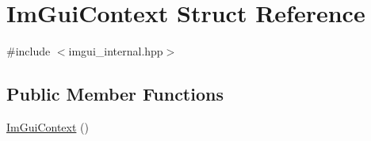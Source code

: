 \hypertarget{struct_im_gui_context}{}\section{Im\+Gui\+Context Struct Reference}
\label{struct_im_gui_context}


{\ttfamily \#include $<$imgui\+\_\+internal.\+hpp$>$}

\subsection*{Public Member Functions}
\begin{DoxyCompactItemize}
\item 
\hyperlink{struct_im_gui_context_a28776600467e31fcc353a8aedec727f1}{Im\+Gui\+Context} ()
\end{DoxyCompactItemize}

